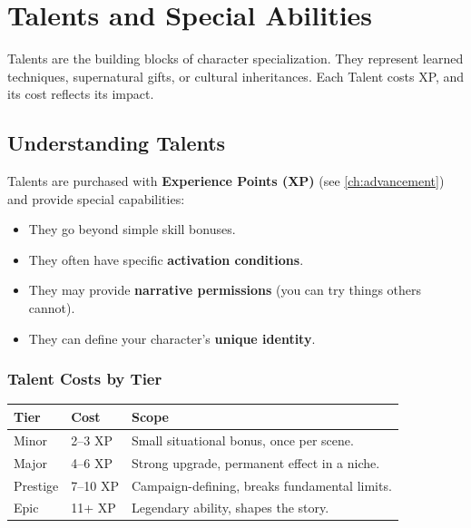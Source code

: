 \chapter{Talents and Special Abilities}
\label{ch:talents}

Talents are the building blocks of character specialization. They represent learned techniques, supernatural gifts, or cultural inheritances. Each Talent costs XP, and its cost reflects its impact.

\section{Understanding Talents}
\label{sec:talents-understanding}

Talents are purchased with \textbf{Experience Points (XP)} (see \ref{ch:advancement}) and provide special capabilities:
\begin{itemize}
\item They go beyond simple skill bonuses.
\item They often have specific \textbf{activation conditions}.
\item They may provide \textbf{narrative permissions} (you can try things others cannot).
\item They can define your character's \textbf{unique identity}.
\end{itemize}

\subsection*{Talent Costs by Tier}
\label{sec:talent-costs}

\begin{center}
\begin{tabular}{lll}
\toprule
\textbf{Tier} & \textbf{Cost} & \textbf{Scope} \\
\midrule
Minor & 2–3 XP & Small situational bonus, once per scene. \\
Major & 4–6 XP & Strong upgrade, permanent effect in a niche. \\
Prestige & 7–10 XP & Campaign-defining, breaks fundamental limits. \\
Epic & 11+ XP & Legendary ability, shapes the story. \\
\bottomrule
\end{tabular}
\end{center}

